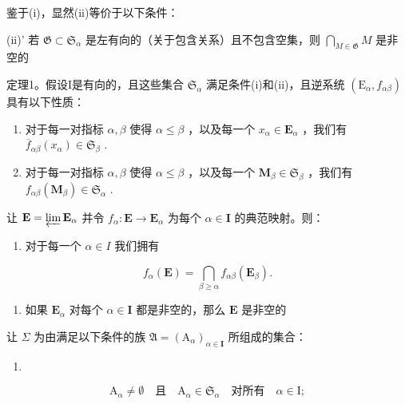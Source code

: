 鉴于(i)，显然(ii)等价于以下条件：

(ii)' 若 \(\mathfrak{G} \subset \mathfrak{S}_{\alpha}\) 是左有向的（关于包含关系）且不包含空集，则 \(\bigcap_{M \in \mathfrak{G}} M\) 是非空的

定理1。假设I是有向的，且这些集合 \(\mathfrak{S}_{\alpha}\) 满足条件(i)和(ii)，且逆系统 \((\mathrm{E}_{\alpha}, f_{\alpha\beta})\) 具有以下性质：

\begin{enumerate}
\def\labelenumi{(\roman{enumi})}
\setcounter{enumi}{2}
\item
  对于每一对指标 \(\alpha, \beta\) 使得 \(\alpha \leqslant \beta\) ，以及每一个 \(x_{\alpha} \in \mathbf{E}_{\alpha}\) ，我们有 \(\overline{f}_{\alpha\beta}(x_{\alpha}) \in \mathfrak{S}_{\beta}\) .
\item
  对于每一对指标 \(\alpha, \beta\) 使得 \(\alpha \leqslant \beta\) ，以及每一个 \(\mathbf{M}_{\beta} \in \mathfrak{S}_{\beta}\) ，我们有 \(f_{\alpha \beta}(\mathbf{M}_{\beta}) \in \mathfrak{S}_{\alpha}\) .
\end{enumerate}

让 \(\mathbf{E} = \varprojlim \mathbf{E}_{\alpha}\) 并令 \(f_{\alpha}: \mathbf{E} \to \mathbf{E}_{\alpha}\) 为每个 \(\alpha \in \mathbf{I}\) 的典范映射。则：

\begin{enumerate}
\def\labelenumi{(\alph{enumi})}
\tightlist
\item
  对于每一个 \(\alpha \in I\) 我们拥有
\end{enumerate}

\[
f _ {\alpha} (\mathbf {E}) = \bigcap_ {\beta \geqslant \alpha} f _ {\alpha \beta} (\mathbf {E} _ {\beta}).\tag{19}
\]

\begin{enumerate}
\def\labelenumi{(\alph{enumi})}
\setcounter{enumi}{1}
\tightlist
\item
  如果 \(\mathbf{E}_{\alpha}\) 对每个 \(\alpha \in \mathbf{I}\) 都是非空的，那么 \(\mathbf{E}\) 是非空的
\end{enumerate}

让 \(\Sigma\) 为由满足以下条件的族 \(\mathfrak{A} = (\mathrm{A}_{\alpha})_{\alpha \in \mathbf{I}}\) 所组成的集合：

\begin{enumerate}
\def\labelenumi{(\arabic{enumi})}
\setcounter{enumi}{19}
\tightlist
\item
\end{enumerate}

\[
\mathrm{A} _ {\alpha} \neq \emptyset \quad \text{且} \quad \mathrm{A} _ {\alpha} \in \mathfrak {S} _ {\alpha} \quad \text{对所有} \quad \alpha \in \mathrm{I};\tag{21}
\]

